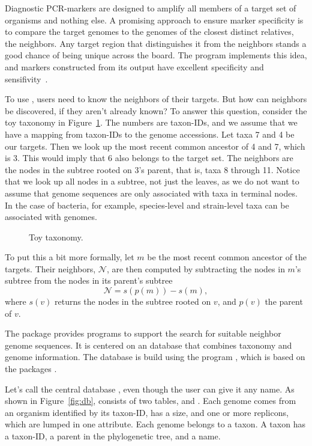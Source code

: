 Diagnostic PCR-markers are designed to amplify all members of a target
set of organisms and nothing else. A promising approach to ensure
marker specificity is to compare the target genomes to the genomes of
the closest distinct relatives, the neighbors. Any target region that
distinguishes it from the neighbors stands a good chance of being
unique across the board. The program  implements this idea,
and markers constructed from its output have excellent specificity and
sensifivity~\cite{hau21:fur}.

To use , users need to know the neighbors of their
targets. But how can neighbors be discovered, if they aren't already
known? To answer this question, consider the toy taxonomy in
Figure~\ref{fig:tax}. The numbers are taxon-IDs, and we assume that we
have a mapping from taxon-IDs to the genome accessions. Let taxa 7 and
4 be our targets. Then we look up the most recent common ancestor of 4
and 7, which is 3. This would imply that 6 also belongs to the target
set. The neighbors are the nodes in the subtree rooted on 3's parent,
that is, taxa 8 through 11. Notice that we look up all nodes in a
subtree, not just the leaves, as we do not want to assume that genome
sequences are only associated with taxa in terminal nodes. In the case
of bacteria, for example, species-level and strain-level taxa can be
associated with genomes.

\begin{figure}
\begin{center}

\end{center}
\caption{Toy taxonomy.}\label{fig:tax}
\end{figure}

To put this a bit more formally, let $m$ be the most recent common
ancestor of the targets. Their neighbors, $\mathcal{N}$, are then
computed by subtracting the nodes in $m$'s subtree from the nodes in
its parent's subtree
\begin{equation}\label{eq:nei}
\mathcal{N} = s(p(m)) - s(m),
\end{equation}
where $s(v)$ returns the nodes in the subtree rooted on $v$, and
$p(v)$ the parent of $v$.

The package  provides programs to support the search for
suitable neighbor genome sequences. It is centered on an 
database that combines taxonomy and genome information. The database
is build using the program , which is based on the
packages .

Let's call the central database , even though the user
can give it any name. As shown in Figure~\ref{fig:db}, 
consists of two tables,  and . Each genome comes
from an organism identified by its taxon-ID, has a size, and one or
more replicons, which are lumped in one attribute. Each genome belongs
to a taxon. A taxon has a taxon-ID, a parent in the phylogenetic tree,
and a name.


